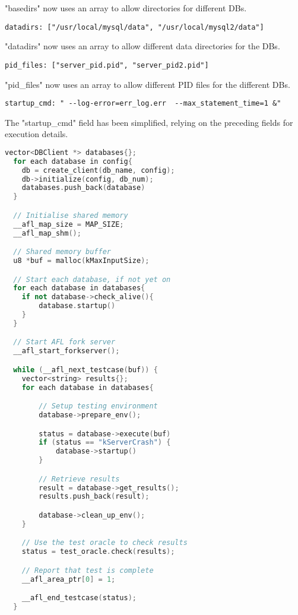 \documentclass[sigconf]{acmart}
\begin{document}
"basedirs" now uses an array to allow directories for different DBs.

\begin{verbatim}
datadirs: ["/usr/local/mysql/data", "/usr/local/mysql2/data"]
\end{verbatim}

"datadirs" now uses an array to allow different data directories for the DBs.

\begin{verbatim}
pid_files: ["server_pid.pid", "server_pid2.pid"]
\end{verbatim}

"pid\_files" now uses an array to allow different PID files for the different DBs.

\begin{verbatim}
startup_cmd: " --log-error=err_log.err  --max_statement_time=1 &"
\end{verbatim}

The "startup\_cmd" field has been simplified, relying on the preceding fields for execution details.

\begin{lstlisting}[language=C++, caption={db\_driver.c Main Eventloop Pseudocode}, label={lst:dbdriver}]
  vector<DBClient *> databases{};
  for each database in config{
    db = create_client(db_name, config);
    db->initialize(config, db_num);
    databases.push_back(database)
  }

  // Initialise shared memory
  __afl_map_size = MAP_SIZE;
  __afl_map_shm();

  // Shared memory buffer
  u8 *buf = malloc(kMaxInputSize); 

  // Start each database, if not yet on
  for each database in databases{
    if not database->check_alive(){
        database.startup()
    }
  }

  // Start AFL fork server
  __afl_start_forkserver();

  while (__afl_next_testcase(buf)) {
    vector<string> results{};
    for each database in databases{

        // Setup testing environment
        database->prepare_env();

        status = database->execute(buf)
        if (status == "kServerCrash") {
            database->startup()
        }

        // Retrieve results
        result = database->get_results();
        results.push_back(result);

        database->clean_up_env();
    }

    // Use the test oracle to check results
    status = test_oracle.check(results);

    // Report that test is complete
    __afl_area_ptr[0] = 1;

    __afl_end_testcase(status);
  }
\end{lstlisting}
\end{document}
